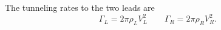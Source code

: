 \documentclass{article}
\begin{document}
The tunneling rates to the two leads are
\begin{equation}
\Gamma_L = 2\pi\rho_L V_L^2 \qquad \Gamma_R = 2\pi\rho_R V_R^2 .
\label{eq:rates}
\end{equation}
\end{document}
